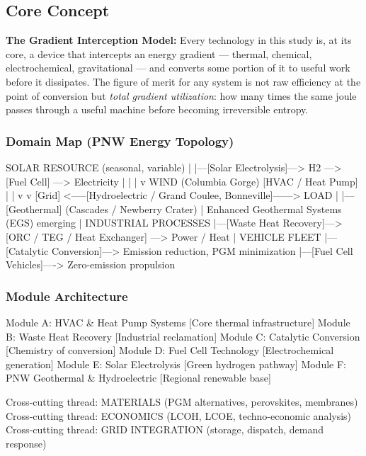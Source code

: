 \documentclass[11pt,letterpaper]{article}
\begin{document}
\subsection{Core Concept}

\textbf{The Gradient Interception Model:} Every technology in this study is, at its core, a device that intercepts an energy gradient — thermal, chemical, electrochemical, gravitational — and converts some portion of it to useful work before it dissipates. The figure of merit for any system is not raw efficiency at the point of conversion but \textit{total gradient utilization}: how many times the same joule passes through a useful machine before becoming irreversible entropy.

\subsubsection{Domain Map (PNW Energy Topology)}

\begin{asciibox}
  SOLAR RESOURCE (seasonal, variable)
         |
         |---[Solar Electrolysis]---> H2 ---> [Fuel Cell] ---> Electricity
         |                                                          |
         |                                                          v
  WIND (Columbia Gorge)                                      [HVAC / Heat Pump]
         |                                                          |
         v                                                          v
  [Grid] <-----[Hydroelectric / Grand Coulee, Bonneville]------> LOAD
         |
         |---[Geothermal] (Cascades / Newberry Crater)
         |         Enhanced Geothermal Systems (EGS) emerging
         |
  INDUSTRIAL PROCESSES
         |---[Waste Heat Recovery]---> [ORC / TEG / Heat Exchanger] ---> Power / Heat
         |
  VEHICLE FLEET
         |---[Catalytic Conversion]---> Emission reduction, PGM minimization
         |---[Fuel Cell Vehicles]----> Zero-emission propulsion
\end{asciibox}

\subsubsection{Module Architecture}

\begin{asciibox}
  Module A: HVAC & Heat Pump Systems        [Core thermal infrastructure]
  Module B: Waste Heat Recovery             [Industrial reclamation]
  Module C: Catalytic Conversion            [Chemistry of conversion]
  Module D: Fuel Cell Technology            [Electrochemical generation]
  Module E: Solar Electrolysis              [Green hydrogen pathway]
  Module F: PNW Geothermal & Hydroelectric  [Regional renewable base]

  Cross-cutting thread: MATERIALS (PGM alternatives, perovskites, membranes)
  Cross-cutting thread: ECONOMICS (LCOH, LCOE, techno-economic analysis)
  Cross-cutting thread: GRID INTEGRATION (storage, dispatch, demand response)
\end{asciibox}
\end{document}

